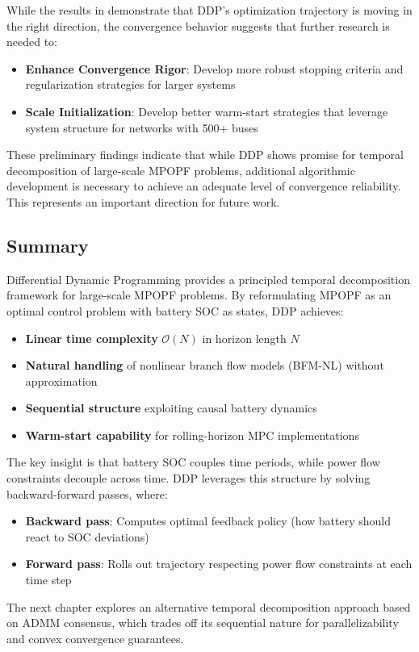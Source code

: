 While the results in  demonstrate that DDP's optimization trajectory is moving in the right direction, the convergence behavior suggests that further research is needed to:
\begin{itemize}
    \item \textbf{Enhance Convergence Rigor}: Develop more robust stopping criteria and regularization strategies for larger systems
    \item \textbf{Scale Initialization}: Develop better warm-start strategies that leverage system structure for networks with 500+ buses
\end{itemize}

These preliminary findings indicate that while DDP shows promise for temporal decomposition of large-scale MPOPF problems, additional algorithmic development is necessary to achieve an adequate level of  convergence reliability. This represents an important direction for future work.

\subsection{Summary}

Differential Dynamic Programming provides a principled temporal decomposition framework for large-scale MPOPF problems. By reformulating MPOPF as an optimal control problem with battery SOC as states, DDP achieves:

\begin{itemize}
    \item \textbf{Linear time complexity} $\mathcal{O}(N)$ in horizon length $N$
    \item \textbf{Natural handling} of nonlinear branch flow models (BFM-NL) without approximation
    \item \textbf{Sequential structure} exploiting causal battery dynamics
    \item \textbf{Warm-start capability} for rolling-horizon MPC implementations
\end{itemize}

The key insight is that battery SOC couples time periods, while power flow constraints decouple across time. DDP leverages this structure by solving backward-forward passes, where:
\begin{itemize}
    \item \textbf{Backward pass}: Computes optimal feedback policy (how battery should react to SOC deviations)
    \item \textbf{Forward pass}: Rolls out trajectory respecting power flow constraints at each time step
\end{itemize}

The next chapter explores an alternative temporal decomposition approach based on ADMM consensus, which trades off its sequential nature for parallelizability and convex convergence guarantees.

